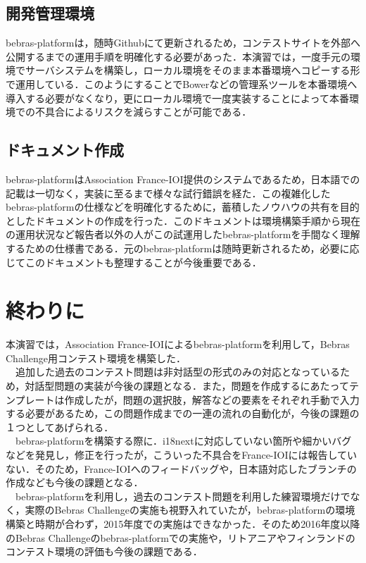 \documentclass[a4paper]{jarticle}
\begin{document}
\begin{multicols}{2}
\subsection{開発管理環境}
bebras-platformは，随時Githubにて更新されるため，コンテストサイトを外部へ公開するまでの運用手順を明確化する必要があった．本演習では，一度手元の環境でサーバシステムを構築し，ローカル環境をそのまま本番環境へコピーする形で運用している．このようにすることでBowerなどの管理系ツールを本番環境へ導入する必要がなくなり，更にローカル環境で一度実装することによって本番環境での不具合によるリスクを減らすことが可能である．

\subsection{ドキュメント作成}
bebras-platformはAssociation France-IOI提供のシステムであるため，日本語での記載は一切なく，実装に至るまで様々な試行錯誤を経た．この複雑化したbebras-platformの仕様などを明確化するために，蓄積したノウハウの共有を目的としたドキュメントの作成を行った．このドキュメントは環境構築手順から現在の運用状況など報告者以外の人がこの試運用したbebras-platformを手間なく理解するための仕様書である．元のbebras-platformは随時更新されるため，必要に応じてこのドキュメントも整理することが今後重要である．

\section{終わりに}
本演習では，Association France-IOIによるbebras-platformを利用して，Bebras Challenge用コンテスト環境を構築した．
\\　追加した過去のコンテスト問題は非対話型の形式のみの対応となっているため，対話型問題の実装が今後の課題となる．また，問題を作成するにあたってテンプレートは作成したが，問題の選択肢，解答などの要素をそれぞれ手動で入力する必要があるため，この問題作成までの一連の流れの自動化が，今後の課題の１つとしてあげられる．
\\　bebras-platformを構築する際に．i18nextに対応していない箇所や細かいバグなどを発見し，修正を行ったが，こういった不具合をFrance-IOIには報告していない．そのため，France-IOIへのフィードバッグや，日本語対応したブランチの作成なども今後の課題となる．
\\　bebras-platformを利用し，過去のコンテスト問題を利用した練習環境だけでなく，実際のBebras Challengeの実施も視野入れていたが，bebras-platformの環境構築と時期が合わず，2015年度での実施はできなかった．そのため2016年度以降のBebras Challengeのbebras-platformでの実施や，リトアニアやフィンランドのコンテスト環境の評価も今後の課題である．

\end{multicols}
\end{document}
